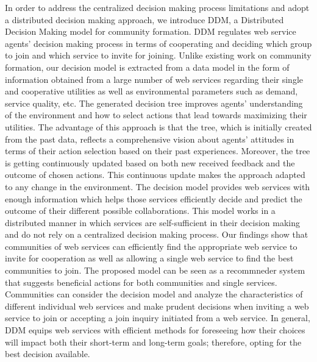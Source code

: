 In order to address the centralized decision making process limitations and adopt a distributed decision making approach, we introduce DDM, a Distributed Decision Making model for community formation. DDM regulates web service agents’ decision making process in terms of cooperating and deciding which group to join and which service to invite for joining. Unlike existing work on community formation, our decision model is extracted from a data model in the form of information obtained from a large number of web services regarding their single and cooperative utilities as well as environmental parameters such as demand, service quality, etc. The generated decision tree improves agents' understanding of the environment and how to select actions that lead towards maximizing their utilities. The advantage of this approach is that the tree, which is initially created from the past data, reflects a comprehensive vision about agents' attitudes in terms of their action selection based on their past experiences. Moreover, the tree is getting continuously updated based on both new received feedback and the outcome of chosen actions. This continuous update makes the approach adapted to any change in the environment.
The decision model provides web services with enough information which helps those services efficiently decide and predict the outcome of their different possible collaborations. This model works in a distributed manner in which services are self-sufficient in their decision making and do not rely on a centralized decision making process. Our findings show that communities of web services can efficiently find the appropriate web service to invite for cooperation as well as allowing a single web service to find the best communities to join. The proposed model can be seen as a recommneder system that suggests beneficial actions for both communities and single services. Communities can consider the decision model and analyze the characteristics of different individual web services and make prudent decisions when inviting a web service to join or accepting a join inquiry initiated from a web service. In general, DDM equips web services with efficient methods for foreseeing how their choices will impact both their short-term and long-term goals; therefore, opting for the best decision available.

